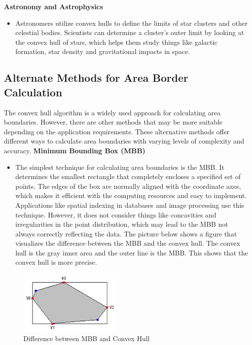     \pagebreak
    
    \textbf{Astronomy and Astrophysics}
    \begin{itemize}
        \item Astronomers utilize convex hulls to define the limits of star clusters and other celestial bodies. Scientists can determine a cluster's outer limit by looking at the convex hull of stars, which helps them study things like galactic formation, star density and gravitational impacts in space.
    \end{itemize}
    \autocite{Andi:irlApplication}

    \subsection{Alternate Methods for Area Border Calculation}
    The convex hull algorithm is a widely used approach for calculating area boundaries. However, there are other methods that may be more suitable depending on the application requirements. These alternative methods offer different ways to calculate area boundaries with varying levels of complexity and accuracy. \newline \newline
    \textbf{Minimum Bounding Box (MBB)}
    \begin{itemize}
        \item The simplest technique for calculating area boundaries is the MBB. It determines the smallest rectangle that completely encloses a specified set of points. The edges of the box are normally aligned with the coordinate axes, which makes it efficient with the computing resources and easy to implement. Applications like spatial indexing in databases and image processing use this technique. However, it does not consider things like concavities and irregularities in the point distribution, which may lead to the MBB not always correctly reflecting the data. The picture below shows a figure that visualizes the difference between the MBB and the convex hull. The convex hull is the gray inner area and the outer line is the MBB. This shows that the convex hull is more precise. \autocite{Andi:mbb}
    \end{itemize} 
    \begin{figure} [H]
        \centering
        \includegraphics [width=0.45\textwidth] {images/andreas/areaBorders/mbb.png}
        \caption{Difference between MBB and Convex Hull \autocite{Andi:mbbPic}}
        
    \end{figure}

